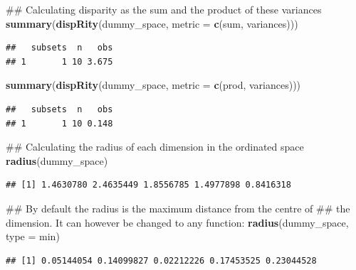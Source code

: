 \documentclass[]{book}
\newenvironment{Shaded}{\begin{snugshade}}{\end{snugshade}}
\newcommand{\KeywordTok}[1]{\textcolor[rgb]{0.13,0.29,0.53}{\textbf{#1}}}
\newcommand{\DataTypeTok}[1]{\textcolor[rgb]{0.13,0.29,0.53}{#1}}
\newcommand{\NormalTok}[1]{#1}
\theoremstyle{definition}
\theoremstyle{definition}
\theoremstyle{remark}
\begin{document}
\begin{Shaded}
\begin{Highlighting}[]
\NormalTok{## Calculating disparity as the sum and the product of these variances}
\KeywordTok{summary}\NormalTok{(}\KeywordTok{dispRity}\NormalTok{(dummy_space, }\DataTypeTok{metric =} \KeywordTok{c}\NormalTok{(sum, variances)))}
\end{Highlighting}
\end{Shaded}

\begin{verbatim}
##   subsets  n   obs
## 1       1 10 3.675
\end{verbatim}

\begin{Shaded}
\begin{Highlighting}[]
\KeywordTok{summary}\NormalTok{(}\KeywordTok{dispRity}\NormalTok{(dummy_space, }\DataTypeTok{metric =} \KeywordTok{c}\NormalTok{(prod, variances)))}
\end{Highlighting}
\end{Shaded}

\begin{verbatim}
##   subsets  n   obs
## 1       1 10 0.148
\end{verbatim}

\begin{Shaded}
\begin{Highlighting}[]
\NormalTok{## Calculating the radius of each dimension in the ordinated space}
\KeywordTok{radius}\NormalTok{(dummy_space)}
\end{Highlighting}
\end{Shaded}

\begin{verbatim}
## [1] 1.4630780 2.4635449 1.8556785 1.4977898 0.8416318
\end{verbatim}

\begin{Shaded}
\begin{Highlighting}[]
\NormalTok{## By default the radius is the maximum distance from the centre of}
\NormalTok{## the dimension. It can however be changed to any function:}
\KeywordTok{radius}\NormalTok{(dummy_space, }\DataTypeTok{type =}\NormalTok{ min)}
\end{Highlighting}
\end{Shaded}

\begin{verbatim}
## [1] 0.05144054 0.14099827 0.02212226 0.17453525 0.23044528
\end{verbatim}
\end{document}
